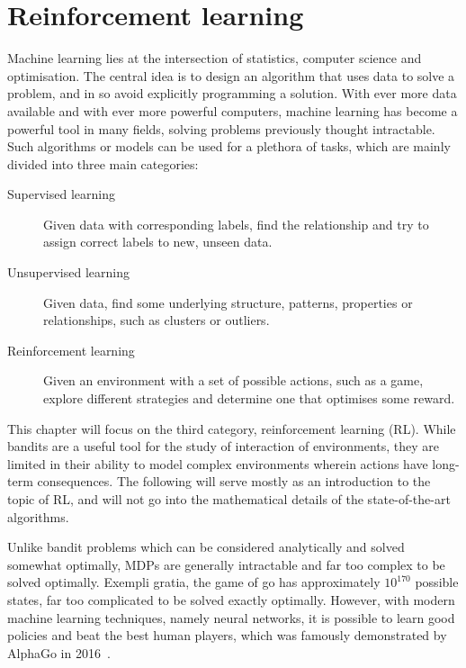 \chapter{Reinforcement learning}
\label{chap:rl}

Machine learning lies at the intersection of statistics, computer science and optimisation.
The central idea is to design an algorithm that uses data to solve a problem, and in so avoid explicitly programming a solution.
With ever more data available and with ever more powerful computers, machine learning has become a powerful tool in many fields, solving problems previously thought intractable.
Such algorithms or models can be used for a plethora of tasks, which are mainly divided into three main categories:
\begin{description}

    \item[Supervised learning]
        Given data with corresponding labels, find the relationship and try to assign correct labels to new, unseen data.

    \item[Unsupervised learning]
        Given data, find some underlying structure, patterns, properties or relationships, such as clusters or outliers.

    \item[Reinforcement learning]
        Given an environment with a set of possible actions, such as a game, explore different strategies and determine one that optimises some reward.

\end{description}

This chapter will focus on the third category, reinforcement learning (RL).
While bandits are a useful tool for the study of interaction of environments, they are limited in their ability to model complex environments wherein actions have long-term consequences.
The following will serve mostly as an introduction to the topic of RL, and will not go into the mathematical details of the state-of-the-art algorithms.

Unlike bandit problems which can be considered analytically and solved somewhat optimally, MDPs are generally intractable and far too complex to be solved optimally.
Exempli gratia, the game of go has approximately $10^{170}$ possible states, far too complicated to be solved exactly optimally.
However, with modern machine learning techniques, namely neural networks, it is possible to learn good policies and beat the best human players, which was famously demonstrated by AlphaGo in 2016~\autocite{silver2016}.

